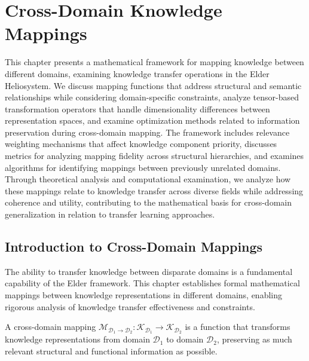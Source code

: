 \chapter{Cross-Domain Knowledge Mappings}

\begin{tcolorbox}[colback=DarkSkyBlue!5!white,colframe=DarkSkyBlue!75!black,title=Chapter Summary]
This chapter presents a mathematical framework for mapping knowledge between different domains, examining knowledge transfer operations in the Elder Heliosystem. We discuss mapping functions that address structural and semantic relationships while considering domain-specific constraints, analyze tensor-based transformation operators that handle dimensionality differences between representation spaces, and examine optimization methods related to information preservation during cross-domain mapping. The framework includes relevance weighting mechanisms that affect knowledge component priority, discusses metrics for analyzing mapping fidelity across structural hierarchies, and examines algorithms for identifying mappings between previously unrelated domains. Through theoretical analysis and computational examination, we analyze how these mappings relate to knowledge transfer across diverse fields while addressing coherence and utility, contributing to the mathematical basis for cross-domain generalization in relation to transfer learning approaches.
\end{tcolorbox}

\section{Introduction to Cross-Domain Mappings}

The ability to transfer knowledge between disparate domains is a fundamental capability of the Elder framework. This chapter establishes formal mathematical mappings between knowledge representations in different domains, enabling rigorous analysis of knowledge transfer effectiveness and constraints.

\begin{definition}
A cross-domain mapping $\mathcal{M}_{\mathcal{D}_1 \rightarrow \mathcal{D}_2}: \mathcal{K}_{\mathcal{D}_1} \rightarrow \mathcal{K}_{\mathcal{D}_2}$ is a function that transforms knowledge representations from domain $\mathcal{D}_1$ to domain $\mathcal{D}_2$, preserving as much relevant structural and functional information as possible.
\end{definition}

